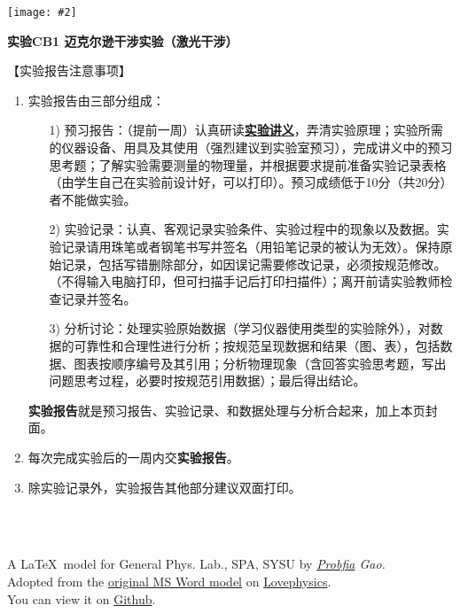 \documentclass[11pt,a4paper]{ctexart}
\newcommand{\ExpeName}{实验CB1 迈克尔逊干涉实验（激光干涉）}
\newcommand{\cpic}[2]{
\begin{center}
\texttt{[image: \#2]}
\end{center}
}
\begin{document}
\cpic{0.255}{e1}%
\begin{center}
\LARGE\textbf{{\ExpeName}}
\end{center}
\large{【实验报告注意事项】}
\begin{enumerate}
 \item 实验报告由三部分组成：
 \begin{enumerate}
  \item[1)]预习报告：（提前一周）认真研读\textbf{\uline{实验讲义}}，弄清实验原理；实验所需的仪器设备、用具及其使用（强烈建议到实验室预习），完成讲义中的预习思考题；了解实验需要测量的物理量，并根据要求提前准备实验记录表格（由学生自己在实验前设计好，可以打印）。预习成绩低于10分（共20分）者不能做实验。
  \item[2)]实验记录：认真、客观记录实验条件、实验过程中的现象以及数据。实验记录请用珠笔或者钢笔书写并签名（{\color{red}用铅笔记录的被认为无效}）。{\color{red}保持原始记录，包括写错删除部分，如因误记需要修改记录，必须按规范修改。}（不得输入电脑打印，但可扫描手记后打印扫描件）；离开前请实验教师检查记录并签名。
  \item[3)]分析讨论：处理实验原始数据（学习仪器使用类型的实验除外），对数据的可靠性和合理性进行分析；按规范呈现数据和结果（图、表），包括数据、图表按顺序编号及其引用；分析物理现象（含回答实验思考题，写出问题思考过程，必要时按规范引用数据）；最后得出结论。
 \end{enumerate}
 \textbf{实验报告}就是预习报告、实验记录、和数据处理与分析合起来，加上本页封面。
 \item 每次完成实验后的一周内交\textbf{实验报告}。
 \item 除实验记录外，实验报告其他部分建议双面打印。
\end{enumerate}
\ 
\\
\ 

\begin{flushright}                                                           %
\tiny{
A \LaTeX \ model for General Phys. Lab., SPA, SYSU by {\em \href{https://www.weibo.com/3532532974/profile?rightmod=1&wvr=6&mod=personinfo&is_all=1}{Probfia} Gao.}\\ Adopted from the \href{http://lovephysics.sysu.edu.cn/lib/exe/fetch.php?media=courses:secondlevelzhuhai:report.docx}{original MS Word model} on \href{http://lovephysics.sysu.edu.cn}{Lovephysics}.\\ You can view it on \href{https://github.com/Probfia/SYSU_GPL_C}{Github}.}
\end{flushright}
\end{document}
